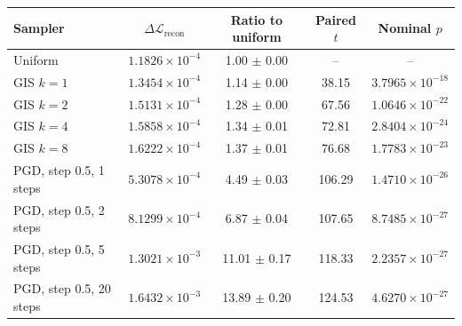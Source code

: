 \begin{tabular}{lcccc}
\toprule
Sampler & $\Delta\mathcal{L}_{\mathrm{recon}}$ & Ratio to uniform & Paired $t$ & Nominal $p$ \\
\midrule
Uniform & $1.1826 \times 10^{-4}$ & 1.00 $\pm$ 0.00 & -- & -- \\
GIS $k=1$ & $1.3454 \times 10^{-4}$ & 1.14 $\pm$ 0.00 & 38.15 & $3.7965 \times 10^{-18}$ \\
GIS $k=2$ & $1.5131 \times 10^{-4}$ & 1.28 $\pm$ 0.00 & 67.56 & $1.0646 \times 10^{-22}$ \\
GIS $k=4$ & $1.5858 \times 10^{-4}$ & 1.34 $\pm$ 0.01 & 72.81 & $2.8404 \times 10^{-24}$ \\
GIS $k=8$ & $1.6222 \times 10^{-4}$ & 1.37 $\pm$ 0.01 & 76.68 & $1.7783 \times 10^{-23}$ \\
PGD, step 0.5, 1 steps & $5.3078 \times 10^{-4}$ & 4.49 $\pm$ 0.03 & 106.29 & $1.4710 \times 10^{-26}$ \\
PGD, step 0.5, 2 steps & $8.1299 \times 10^{-4}$ & 6.87 $\pm$ 0.04 & 107.65 & $8.7485 \times 10^{-27}$ \\
PGD, step 0.5, 5 steps & $1.3021 \times 10^{-3}$ & 11.01 $\pm$ 0.17 & 118.33 & $2.2357 \times 10^{-27}$ \\
PGD, step 0.5, 20 steps & $1.6432 \times 10^{-3}$ & 13.89 $\pm$ 0.20 & 124.53 & $4.6270 \times 10^{-27}$ \\
\bottomrule
\end{tabular}